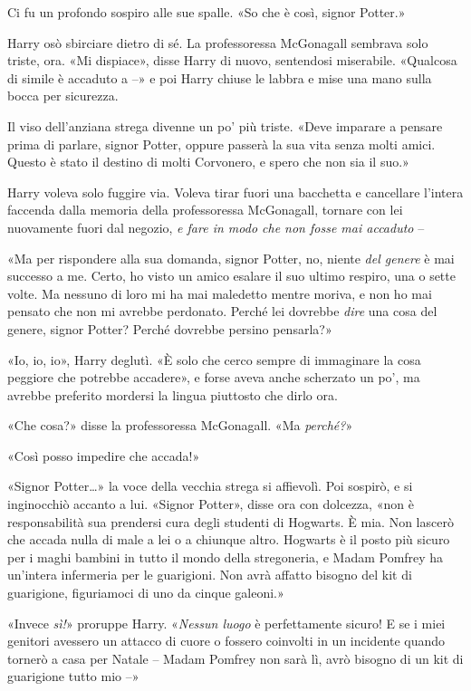 Ci fu un profondo sospiro alle sue spalle. «So che è così, signor Potter.»

Harry osò sbirciare dietro di sé. La professoressa McGonagall sembrava solo triste, ora. «Mi dispiace», disse Harry di nuovo, sentendosi miserabile. «Qualcosa di simile è accaduto a –» e poi Harry chiuse le labbra e mise una mano sulla bocca per sicurezza.

Il viso dell’anziana strega divenne un po’ più triste. «Deve imparare a pensare prima di parlare, signor Potter, oppure passerà la sua vita senza molti amici. Questo è stato il destino di molti Corvonero, e spero che non sia il suo.»

Harry voleva solo fuggire via. Voleva tirar fuori una bacchetta e cancellare l’intera faccenda dalla memoria della professoressa McGonagall, tornare con lei nuovamente fuori dal negozio, \textit{e fare in modo che non fosse mai accaduto} –

«Ma per rispondere alla sua domanda, signor Potter, no, niente \textit{del genere} è mai successo a me. Certo, ho visto un amico esalare il suo ultimo respiro, una o sette volte. Ma nessuno di loro mi ha mai maledetto mentre moriva, e non ho mai pensato che non mi avrebbe perdonato. Perché lei dovrebbe \textit{dire} una cosa del genere, signor Potter? Perché dovrebbe persino pensarla?»

«Io, io, io», Harry deglutì. «È solo che cerco sempre di immaginare la cosa peggiore che potrebbe accadere», e forse aveva anche scherzato un po’, ma avrebbe preferito mordersi la lingua piuttosto che dirlo ora.

«Che cosa?» disse la professoressa McGonagall. «Ma \textit{perché?}»

«Così posso impedire che accada!»

«Signor Potter…» la voce della vecchia strega si affievolì. Poi sospirò, e si inginocchiò accanto a lui. «Signor Potter», disse ora con dolcezza, «non è responsabilità sua prendersi cura degli studenti di Hogwarts. È mia. Non lascerò che accada nulla di male a lei o a chiunque altro. Hogwarts è il posto più sicuro per i maghi bambini in tutto il mondo della stregoneria, e Madam Pomfrey ha un’intera infermeria per le guarigioni. Non avrà affatto bisogno del kit di guarigione, figuriamoci di uno da cinque galeoni.»

«Invece \textit{sì!}» proruppe Harry. «\textit{Nessun luogo} è perfettamente sicuro! E se i miei genitori avessero un attacco di cuore o fossero coinvolti in un incidente quando tornerò a casa per Natale – Madam Pomfrey non sarà lì, avrò bisogno di un kit di guarigione tutto mio –»

